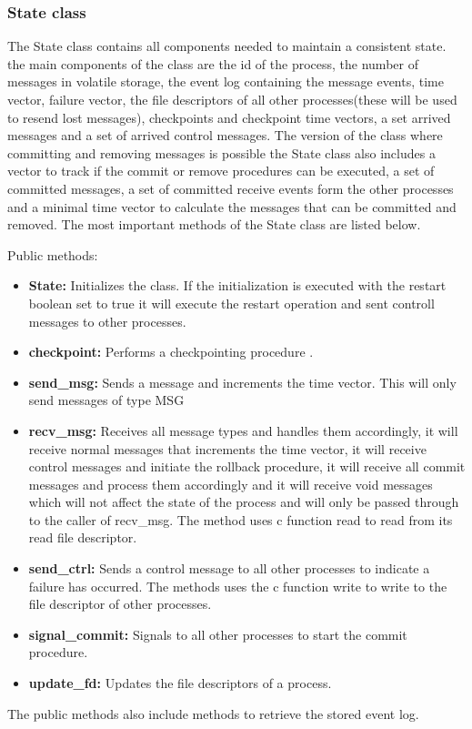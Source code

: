 \documentclass[twocolumn, a4paper,11pt]{article}%
\begin{document}
\subsubsection*{State class}
The State class contains all components needed to maintain a consistent state. the main components of the class are the id of the process, the number of messages in volatile storage, the event log containing the message events, time vector,  failure vector, the file descriptors of all other processes(these will be used to resend lost messages), checkpoints and checkpoint time vectors, a set arrived messages and a set of arrived control messages. The version of the class where committing and removing messages is possible the State class also includes a vector to track if the commit or remove procedures can be executed, a set of committed messages, a set of committed receive events form the other processes and a minimal time vector to calculate the messages that can be committed and removed. The most important methods of the State class are listed below.
\par Public methods:
\begin{itemize}
	\item \textbf{State:}
	Initializes the class. If the initialization is executed with the restart boolean set to true it will execute the restart operation and sent controll messages to other processes.
	\item \textbf{checkpoint:}
	Performs a checkpointing procedure .
	\item \textbf{send\_msg:}
	Sends a message and increments the time vector. This will only send messages of type MSG
	\item \textbf{recv\_msg:}
	Receives all message types and handles them accordingly, it will receive normal messages that increments the time vector, it will receive control messages and initiate the rollback procedure, it will receive all commit messages and process them accordingly and it will receive void messages which will not affect the state of the process and will only be passed through to the caller of recv\_msg. The method uses c function read to read from its read file descriptor.
	\item \textbf{send\_ctrl:}
	Sends a control message to all other processes to indicate a failure has occurred. The methods uses  the c function write to write to the  file descriptor of other processes.
	\item \textbf{signal\_commit:}
	Signals to all other processes to start the commit procedure.
	\item \textbf{update\_fd:}
	Updates the file descriptors of a process.
\end{itemize}
The public methods also include methods to retrieve the stored event log.
\end{document}
